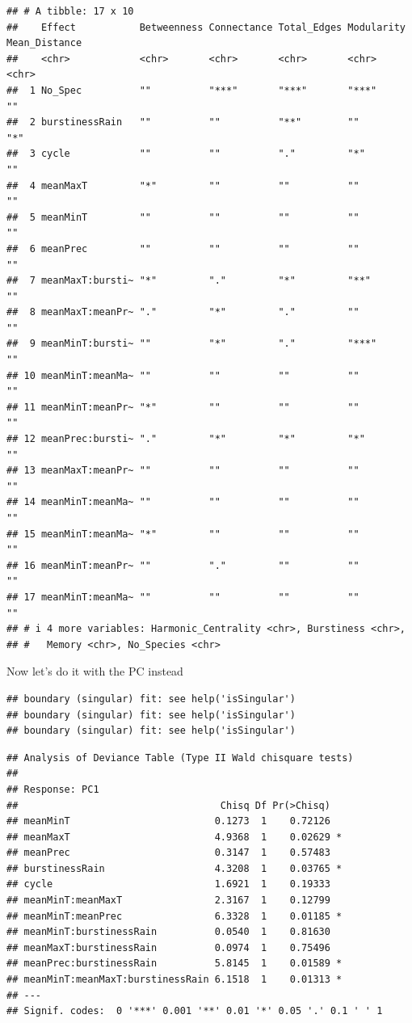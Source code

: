 \documentclass[
]{article}
\begin{document}
\begin{verbatim}
## # A tibble: 17 x 10
##    Effect           Betweenness Connectance Total_Edges Modularity Mean_Distance
##    <chr>            <chr>       <chr>       <chr>       <chr>      <chr>        
##  1 No_Spec          ""          "***"       "***"       "***"      ""           
##  2 burstinessRain   ""          ""          "**"        ""         "*"          
##  3 cycle            ""          ""          "."         "*"        ""           
##  4 meanMaxT         "*"         ""          ""          ""         ""           
##  5 meanMinT         ""          ""          ""          ""         ""           
##  6 meanPrec         ""          ""          ""          ""         ""           
##  7 meanMaxT:bursti~ "*"         "."         "*"         "**"       ""           
##  8 meanMaxT:meanPr~ "."         "*"         "."         ""         ""           
##  9 meanMinT:bursti~ ""          "*"         "."         "***"      ""           
## 10 meanMinT:meanMa~ ""          ""          ""          ""         ""           
## 11 meanMinT:meanPr~ "*"         ""          ""          ""         ""           
## 12 meanPrec:bursti~ "."         "*"         "*"         "*"        ""           
## 13 meanMaxT:meanPr~ ""          ""          ""          ""         ""           
## 14 meanMinT:meanMa~ ""          ""          ""          ""         ""           
## 15 meanMinT:meanMa~ "*"         ""          ""          ""         ""           
## 16 meanMinT:meanPr~ ""          "."         ""          ""         ""           
## 17 meanMinT:meanMa~ ""          ""          ""          ""         ""           
## # i 4 more variables: Harmonic_Centrality <chr>, Burstiness <chr>,
## #   Memory <chr>, No_Species <chr>
\end{verbatim}

Now let's do it with the PC instead

\begin{verbatim}
## boundary (singular) fit: see help('isSingular')
## boundary (singular) fit: see help('isSingular')
## boundary (singular) fit: see help('isSingular')
\end{verbatim}

\begin{verbatim}
## Analysis of Deviance Table (Type II Wald chisquare tests)
## 
## Response: PC1
##                                   Chisq Df Pr(>Chisq)  
## meanMinT                         0.1273  1    0.72126  
## meanMaxT                         4.9368  1    0.02629 *
## meanPrec                         0.3147  1    0.57483  
## burstinessRain                   4.3208  1    0.03765 *
## cycle                            1.6921  1    0.19333  
## meanMinT:meanMaxT                2.3167  1    0.12799  
## meanMinT:meanPrec                6.3328  1    0.01185 *
## meanMinT:burstinessRain          0.0540  1    0.81630  
## meanMaxT:burstinessRain          0.0974  1    0.75496  
## meanPrec:burstinessRain          5.8145  1    0.01589 *
## meanMinT:meanMaxT:burstinessRain 6.1518  1    0.01313 *
## ---
## Signif. codes:  0 '***' 0.001 '**' 0.01 '*' 0.05 '.' 0.1 ' ' 1
\end{verbatim}
\end{document}
